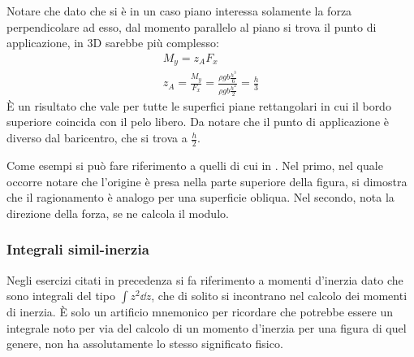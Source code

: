 Notare che dato che si è in un caso piano interessa solamente la forza perpendicolare ad esso, dal momento parallelo al piano si trova il punto di applicazione, in 3D sarebbe più complesso:
	\begin{equation*}
		\begin{gathered}
			M_y = z_A F_x \\
			z_A = \frac{M_y}{F_x} = \frac{\rho g b \frac{h^3}{6}}{\rho g b \frac{h^2}{2}} = \frac{h}{3}
		\end{gathered}
	\end{equation*}
È un risultato che vale per tutte le superfici piane rettangolari in cui il bordo superiore coincida con il pelo libero. Da notare che il punto di applicazione è diverso dal baricentro, che si trova a $\frac{h}{2}$.	

Come esempi si può fare riferimento a quelli di cui in \cite[Fig.\ 3.4, 3.6]{PnueliGutfinger}.
Nel primo, nel quale occorre notare che l'origine è presa nella parte superiore della figura, si dimostra che il ragionamento è analogo per una superficie obliqua.
Nel secondo, nota la direzione della forza, se ne calcola il modulo.

\subsubsection{Integrali simil-inerzia}
Negli esercizi citati in precedenza si fa riferimento a momenti d'inerzia dato che sono integrali del tipo $\int z^2 \dd{z}$, che di solito si incontrano nel calcolo dei momenti di inerzia.
È solo un artificio mnemonico per ricordare che potrebbe essere un integrale noto per via del calcolo di un momento d'inerzia per una figura di quel genere, non ha assolutamente lo stesso significato fisico.
%
